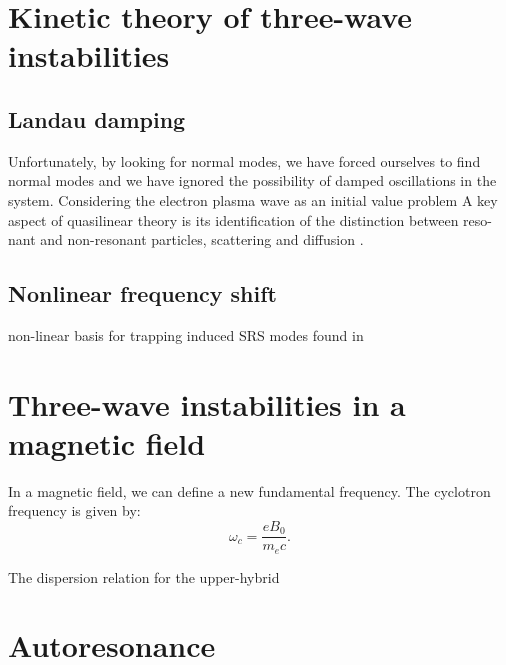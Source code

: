 \section{Kinetic theory of three-wave instabilities}


\subsection{Landau damping}


Unfortunately, by looking for normal modes, we have forced ourselves to find normal modes and we have ignored the possibility of damped oscillations in the system. Considering the electron plasma wave as an initial value problem 
A key aspect of quasilinear theory is its identification of the distinction between reso-
nant and non-resonant particles, scattering and diffusion \citep{Sagdeev2018}.

\subsection{Nonlinear frequency shift}
non-linear basis for trapping induced SRS modes found in \cite{Rose2001}



\section{Three-wave instabilities in a magnetic field}

In a magnetic field, we can define a new fundamental frequency. The cyclotron frequency is given by:
\begin{equation}
\omega_c = \frac{eB_0}{m_ec}.
\end{equation}

The dispersion relation for the upper-hybrid 

\section{Autoresonance}

